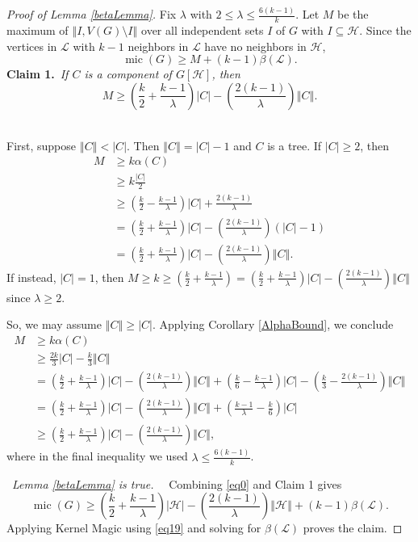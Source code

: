 \documentclass[10pt]{article}
\theoremstyle{plain}
\theoremstyle{definition}
\theoremstyle{remark}
\newcommand{\fancy}[1]{\mathcal{#1}}
\renewcommand{\L}{\fancy{L}}
\newcommand{\HH}{\fancy{H}}
\newcommand{\card}[1]{\left|#1\right|}
\newcommand{\size}[1]{\left\Vert#1\right\Vert}
\newcommand{\parens}[1]{\left( #1 \right)}
\newcommand{\mic}{\operatorname{mic}}
\newcommand{\claim}[2]{{\bf Claim #1.}~{\it #2}~~}
\begin{document}
\begin{proof}[Proof of Lemma \ref{betaLemma}]
Fix $\lambda$ with $2 \le \lambda \le \frac{6(k-1)}{k}$. Let $M$ be the maximum of $\size{I, V(G) \setminus I}$ over all independent sets $I$ of $G$ with $I \subseteq \HH$.   Since the vertices in $\L$ with $k-1$ neighbors in $\L$ have no neighbors in $\HH$,
	\begin{equation}
		\mic(G) \ge M + (k-1)\beta(\L).\label{eq0}
	\end{equation}
\claim{1}{If $C$ is a component of $G[\HH]$, then \[M \ge \parens{\frac{k}{2} + \frac{k-1}{\lambda}}\card{C} - \parens{\frac{2(k-1)}{\lambda}}\size{C}.\]}

First, suppose $\size{C} < \card{C}$.  Then $\size{C} = \card{C} - 1$ and $C$ is a tree.  If $\card{C} \ge 2$, then
	\begin{align*}
		M &\ge k\alpha(C) \\
		&\ge k\frac{\card{C}}{2}\\
		&\ge \parens{\frac{k}{2} - \frac{k-1}{\lambda}}\card{C} + \frac{2(k-1)}{\lambda}\\
		&=\parens{\frac{k}{2} + \frac{k-1}{\lambda}}\card{C} - \parens{\frac{2(k-1)}{\lambda}}\parens{\card{C} - 1}\\
		&=\parens{\frac{k}{2} + \frac{k-1}{\lambda}}\card{C} - \parens{\frac{2(k-1)}{\lambda}}\size{C}.
	\end{align*}
If instead, $\card{C} = 1$, then $M \ge k \ge \parens{\frac{k}{2} + \frac{k-1}{\lambda}} = \parens{\frac{k}{2} + \frac{k-1}{\lambda}}\card{C} - \parens{\frac{2(k-1)}{\lambda}}\size{C}$ since $\lambda \ge 2$.

So, we may assume $\size{C} \ge \card{C}$.  Applying Corollary \ref{AlphaBound}, we conclude
	\begin{align*}
		M &\ge k\alpha(C) \\
		&\ge \frac{2k}{3}\card{C} - \frac{k}{3}\size{C} \\
		&= \parens{\frac{k}{2} + \frac{k-1}{\lambda}}\card{C} - \parens{\frac{2(k-1)}{\lambda}}\size{C} +  \parens{\frac{k}{6} - \frac{k-1}{\lambda}}\card{C} - \parens{\frac{k}{3} - \frac{2(k-1)}{\lambda}}\size{C} \\
		&= \parens{\frac{k}{2} + \frac{k-1}{\lambda}}\card{C} - \parens{\frac{2(k-1)}{\lambda}}\size{C} +  \parens{\frac{k-1}{\lambda} -\frac{k}{6}}\card{C}\\
		&\ge \parens{\frac{k}{2} + \frac{k-1}{\lambda}}\card{C} - \parens{\frac{2(k-1)}{\lambda}}\size{C},
	\end{align*}
	where in the final inequality we used $\lambda \le \frac{6(k-1)}{k}$.
	
\smallskip

\noindent\claim{2}{Lemma \ref{betaLemma} is true.}
	Combining \eqref{eq0} and Claim 1 gives
	\begin{equation}
	 \mic(G) \ge \parens{\frac{k}{2} + \frac{k-1}{\lambda}}\card{\HH} - \parens{\frac{2(k-1)}{\lambda}}\size{\HH} + (k-1)\beta(\L).
	 \label{eq19}
	\end{equation}
	Applying Kernel Magic using \eqref{eq19} and solving for $\beta(\L)$ proves the claim.
\end{proof}
\end{document}
